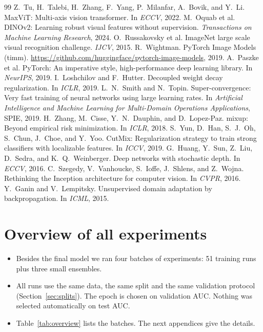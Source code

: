\documentclass[11pt]{article}
\begin{document}
\begin{thebibliography}{99}
 Z.~Tu, H.~Talebi, H.~Zhang, F.~Yang, P.~Milanfar, A.~Bovik, and Y.~Li. MaxViT: Multi-axis vision transformer. In \emph{ECCV}, 2022.
 M.~Oquab et al. DINOv2: Learning robust visual features without supervision. \emph{Transactions on Machine Learning Research}, 2024.
 O.~Russakovsky et al. ImageNet large scale visual recognition challenge. \emph{IJCV}, 2015.
 R.~Wightman. PyTorch Image Models (timm). \url{https://github.com/huggingface/pytorch-image-models}, 2019.
 A.~Paszke et al. PyTorch: An imperative style, high-performance deep learning library. In \emph{NeurIPS}, 2019.
 I.~Loshchilov and F.~Hutter. Decoupled weight decay regularization. In \emph{ICLR}, 2019.
 L.~N.~Smith and N.~Topin. Super-convergence: Very fast training of neural networks using large learning rates. In \emph{Artificial Intelligence and Machine Learning for Multi-Domain Operations Applications}, SPIE, 2019.
 H.~Zhang, M.~Cisse, Y.~N.~Dauphin, and D.~Lopez-Paz. mixup: Beyond empirical risk minimization. In \emph{ICLR}, 2018.
 S.~Yun, D.~Han, S.~J.~Oh, S.~Chun, J.~Choe, and Y.~Yoo. CutMix: Regularization strategy to train strong classifiers with localizable features. In \emph{ICCV}, 2019.
 G.~Huang, Y.~Sun, Z.~Liu, D.~Sedra, and K.~Q.~Weinberger. Deep networks with stochastic depth. In \emph{ECCV}, 2016.
 C.~Szegedy, V.~Vanhoucke, S.~Ioffe, J.~Shlens, and Z.~Wojna. Rethinking the Inception architecture for computer vision. In \emph{CVPR}, 2016.
 Y.~Ganin and V.~Lempitsky. Unsupervised domain adaptation by backpropagation. In \emph{ICML}, 2015.
\end{thebibliography}

\appendix
\section{Overview of all experiments}\label{app:overview}
\begin{itemize}
\item Besides the final model we ran four batches of experiments: 51 training runs plus three small ensembles.
\item All runs use the same data, the same split and the same validation protocol (Section~\ref{sec:splits}). The epoch is chosen on validation AUC. Nothing was selected automatically on test AUC.
\item Table~\ref{tab:overview} lists the batches. The next appendices give the details.
\end{itemize}
\end{document}
